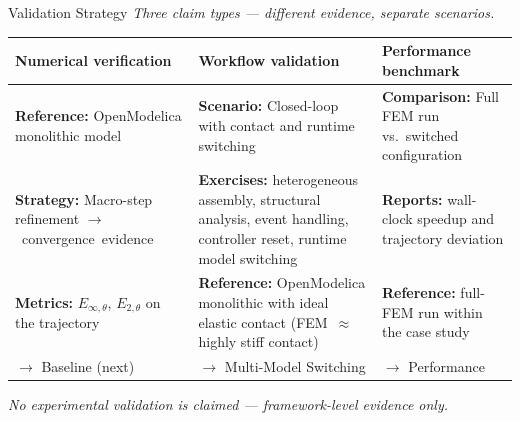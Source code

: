\begin{frame}{Validation Strategy}
  \centering
  \small\itshape Three claim types --- different evidence, separate scenarios.
  \vspace{0.8em}

  \footnotesize
  \begin{tabular}{
      >{\raggedright\arraybackslash}p{}
      >{\raggedright\arraybackslash}p{}
      >{\raggedright\arraybackslash}p{}}
    \toprule
    \textbf{Numerical verification} &
    \textbf{Workflow validation} &
    \textbf{Performance benchmark} \\
    \midrule

    \textbf{Reference:}\newline
    OpenModelica monolithic model &
    \textbf{Scenario:}\newline
    Closed-loop with contact and runtime switching &
    \textbf{Comparison:}\newline
    Full \ac{FEM} run vs.\ switched configuration \\
    \addlinespace[4pt]

    \textbf{Strategy:}\newline
    Macro-step refinement \mbox{$\to$ convergence evidence} &
    \textbf{Exercises:}\newline
    heterogeneous assembly, structural analysis, event handling, controller reset, runtime model switching &
    \textbf{Reports:}\newline
    wall-clock speedup and trajectory deviation \\
    \addlinespace[4pt]

    \textbf{Metrics:}\newline
    \(E_{\infty,\theta}\), \(E_{2,\theta}\) on the trajectory &
    \textbf{Reference:}\newline
    OpenModelica monolithic with ideal elastic contact \newline
    (\ac{FEM}~$\approx$ highly stiff contact) &
    \textbf{Reference:}\newline
    full-\ac{FEM} run within the case study \\
    \midrule

    \(\to\) Baseline (next) &
    \(\to\) Multi-Model Switching &
    \(\to\) Performance \\
    \bottomrule
  \end{tabular}

  \vspace{1.2em}
  \footnotesize
  \emph{No experimental validation is claimed --- framework-level evidence only.}
\end{frame}



